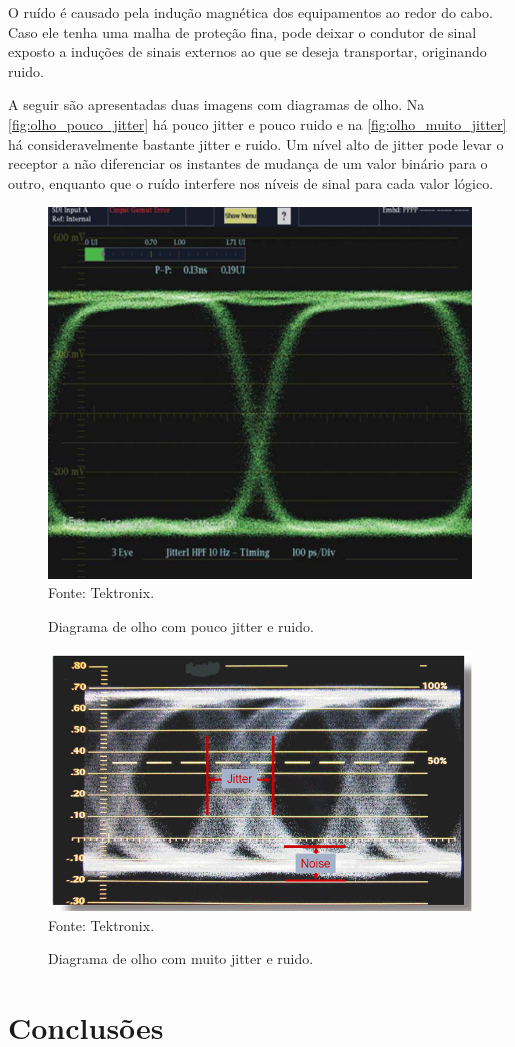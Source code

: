 \documentclass[
	12pt,				%
	oneside,			%
	a4paper,			%
	brazil
	]{abntex2}
\begin{document}
O ruído é causado pela indução magnética dos equipamentos ao redor do cabo. Caso ele tenha uma malha de proteção fina, pode deixar o condutor de sinal exposto a induções de sinais externos ao que se deseja transportar, originando ruido.

A seguir são apresentadas duas imagens com diagramas de olho. Na \autoref{fig:olho_pouco_jitter} há pouco jitter e pouco ruido e na \autoref{fig:olho_muito_jitter} há consideravelmente bastante jitter e ruido. Um nível alto de jitter pode levar o receptor a não diferenciar os instantes de mudança de um valor binário para o outro, enquanto que o ruído interfere nos níveis de sinal para cada valor lógico.

\begin{figure}[!h]
\centering
\caption{Diagrama de olho com pouco jitter e ruido.}
\includegraphics[width=0.5\linewidth]{figuras/olho_pouco_jitter.png}
\\Fonte: Tektronix.
\label{fig:olho_pouco_jitter}
\end{figure}

\begin{figure}[!h]
\centering
\caption{Diagrama de olho com muito jitter e ruido.}
\includegraphics[width=0.5\linewidth]{figuras/olho_muito_jitter.png}
\\Fonte: Tektronix.
\label{fig:olho_muito_jitter}
\end{figure}

\chapter[Conclusões]{Conclusões}
\end{document}
